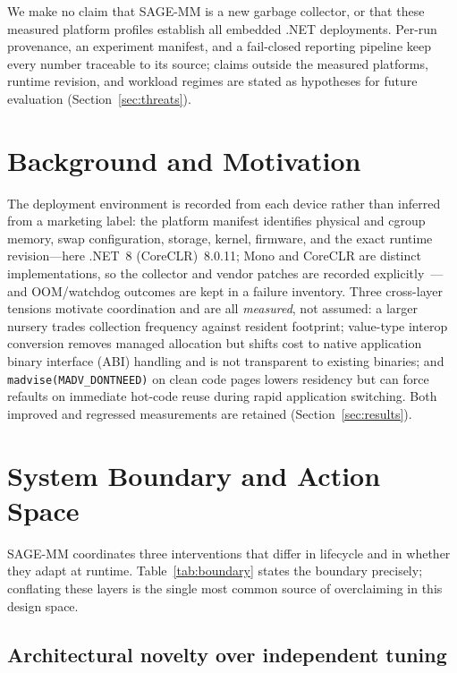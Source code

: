 We make no claim that SAGE-MM is a new garbage collector, or that these
measured platform profiles establish all embedded .NET deployments. Per-run
provenance, an experiment manifest, and a fail-closed reporting pipeline keep
every number traceable to its source; claims outside the measured platforms,
runtime revision, and workload regimes are stated as hypotheses for future
evaluation (Section~\ref{sec:threats}).

\section{Background and Motivation}
\label{sec:motivation}

The deployment environment is recorded from each device rather than inferred
from a marketing label: the platform manifest identifies physical and cgroup
memory, swap configuration, storage, kernel, firmware, and the exact runtime
revision---here .NET~8 (CoreCLR)~8.0.11; Mono and CoreCLR are distinct
implementations, so the collector and vendor patches are recorded
explicitly~\cite{snowflake2017}---and OOM/watchdog outcomes are kept in a failure
inventory. Three cross-layer tensions motivate coordination and are all
\emph{measured}, not assumed: a larger nursery trades collection frequency
against resident footprint; value-type interop conversion removes managed
allocation but shifts cost to native application binary interface (ABI) handling
and is not transparent to
existing binaries; and \texttt{madvise(MADV\_DONTNEED)} on clean code pages
lowers residency but can force refaults on immediate hot-code reuse during rapid
application switching. Both improved and regressed measurements are retained
(Section~\ref{sec:results}).

\section{System Boundary and Action Space}
\label{sec:boundary}

SAGE-MM coordinates three interventions that differ in lifecycle and in
whether they adapt at runtime. Table~\ref{tab:boundary} states the boundary
precisely; conflating these layers is the single most common source of
overclaiming in this design space.

\subsection{Architectural novelty over independent tuning}
\label{sec:architectural-novelty}

